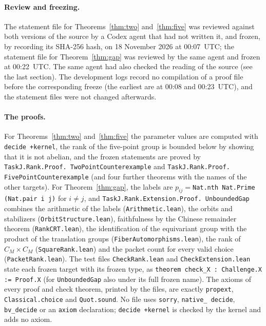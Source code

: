\documentclass[11pt]{article}
\theoremstyle{remark}
\begin{document}
\paragraph{Review and freezing.}
The statement file for Theorems~\ref{thm:two} and~\ref{thm:five} was reviewed
against both versions of the source by a Codex agent that had not written it,
and frozen, by recording its SHA-256 hash, on 18 November 2026 at 00:07~UTC;
the statement file for Theorem~\ref{thm:gap} was reviewed by the same agent and
frozen at 00:22~UTC. The same agent had also checked the reading of the source
(see the last section). The development logs record no compilation of a
proof file before the corresponding freeze (the earliest are at 00:08 and
00:23~UTC), and the statement files were not changed afterwards.

\paragraph{The proofs.}
For Theorems~\ref{thm:two} and~\ref{thm:five} the parameter values are
computed with \texttt{decide~+kernel}, the rank of the five-point group is
bounded below by showing that it is not abelian, and the frozen statements are
proved by \texttt{TaskJ.\allowbreak Rank.\allowbreak Proof.\allowbreak
TwoPointCounterexample} and
\texttt{TaskJ.\allowbreak Rank.\allowbreak Proof.\allowbreak
FivePointCounterexample} (and four further theorems with the names of the
other targets). For Theorem~\ref{thm:gap}, the labels are
$p_{ij}={}$\texttt{Nat.nth Nat.Prime (Nat.pair i j)} for $i\ne j$, and
\texttt{TaskJ.\allowbreak Rank.\allowbreak Extension.\allowbreak Proof.\allowbreak
UnboundedGap} combines the arithmetic of the labels
(\texttt{Arithmetic.lean}), the orbits and stabilizers
(\texttt{OrbitStructure.lean}), faithfulness by the Chinese remainder theorem
(\texttt{RankCRT.lean}), the identification of the equivariant group with the
product of the translation groups (\texttt{FiberAutomorphisms.lean}), the rank
of $C_M\times C_M$ (\texttt{SquareRank.lean}) and the packet count for every
valid choice (\texttt{PacketRank.lean}). The test files
\texttt{CheckRank.lean} and \texttt{CheckExtension.lean} state each frozen
target with its frozen type, as \texttt{theorem check\_X : Challenge.X :=
Proof.X} (for \texttt{UnboundedGap} also under its full frozen name). The axioms of every proof and check theorem, printed by the files,
are exactly \texttt{propext}, \texttt{Classical.choice} and
\texttt{Quot.sound}. No file uses \texttt{sorry}, \texttt{native\_\allowbreak
decide}, \texttt{bv\_\allowbreak decide} or an \texttt{axiom} declaration;
\texttt{decide~+kernel} is checked by the kernel and adds no axiom.
\end{document}
